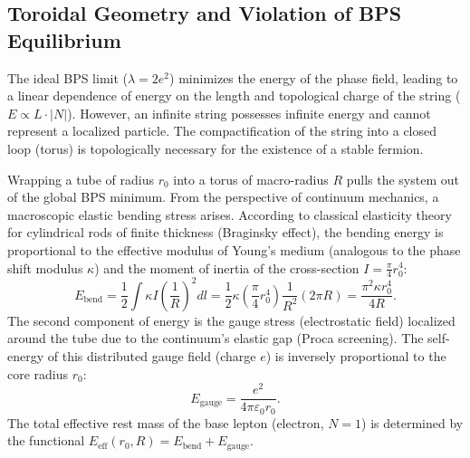 \documentclass[11pt,a4paper]{article}
\begin{document}
\subsection{Toroidal Geometry and Violation of BPS Equilibrium}
The ideal BPS limit ($\lambda = 2e^2$) minimizes the energy of the phase field, leading to a linear dependence of energy on the length and topological charge of the string ($E \propto L \cdot |N|$). However, an infinite string possesses infinite energy and cannot represent a localized particle. The compactification of the string into a closed loop (torus) is topologically necessary for the existence of a stable fermion.

Wrapping a tube of radius $r_0$ into a torus of macro-radius $R$ pulls the system out of the global BPS minimum. From the perspective of continuum mechanics, a macroscopic elastic bending stress arises. According to classical elasticity theory for cylindrical rods of finite thickness (Braginsky effect), the bending energy is proportional to the effective modulus of Young's medium (analogous to the phase shift modulus $\kappa$) and the moment of inertia of the cross-section $I = \frac{\pi}{4} r_0^4$:
\begin{equation}
E_{\text{bend}} = \frac{1}{2} \int \kappa I \left( \frac{1}{R} \right)^2 dl = \frac{1}{2} \kappa \left( \frac{\pi}{4} r_0^4 \right) \frac{1}{R^2} (2\pi R) = \frac{\pi^2 \kappa r_0^4}{4R}.
\label{eq:ebend}
\end{equation}
The second component of energy is the gauge stress (electrostatic field) localized around the tube due to the continuum's elastic gap (Proca screening). The self-energy of this distributed gauge field (charge $e$) is inversely proportional to the core radius $r_0$:
\begin{equation}
E_{\text{gauge}} = \frac{e^2}{4\pi\varepsilon_0 r_0}.
\label{eq:egauge}
\end{equation}
The total effective rest mass of the base lepton (electron, $N=1$) is determined by the functional $E_{\text{eff}}(r_0, R) = E_{\text{bend}} + E_{\text{gauge}}$.
\end{document}
